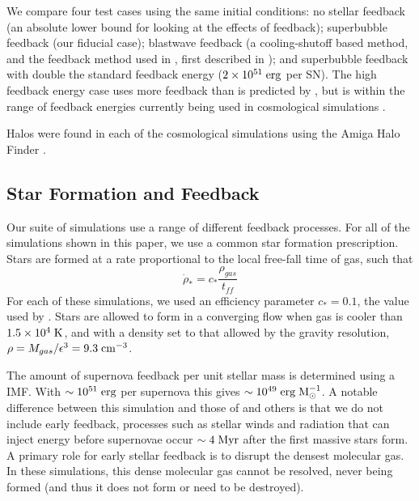 We compare four test cases using the same initial conditions: no stellar
feedback (an absolute lower bound for looking at the effects of feedback);
superbubble feedback (our fiducial case); blastwave feedback (a cooling-shutoff
based method, and the feedback method used in \citet{Stinson2010}, first
described in \citealt{Stinson2006}); and superbubble feedback with double the
standard feedback energy ($2\times10^{51}\; \rm{erg}$ per SN).  The high
feedback energy case uses more feedback than is predicted by
\citet{Leitherer1999}, but is within the range of feedback energies currently
being used in cosmological simulations \citep{Schaye2015, Agertz2015,
Vogelsberger2013}.  

Halos were found in each of the cosmological simulations using the Amiga Halo
Finder \citep[AHF;][]{Knollmann2009}.

\subsection{Star Formation and Feedback}
Our suite of simulations use a range of different feedback
processes.  For all of the simulations shown in this paper, we use a common
star formation prescription.  Stars are formed at a rate proportional to the
local free-fall time of gas, such that
\begin{equation}
    \dot \rho_* = c_* \frac{\rho_{gas}}{t_{ff}}
    \label{sflaw2}
\end{equation}
For each of these simulations, we used an efficiency parameter $c_* = 0.1$, the
value used by \citet{Stinson2013}.  Stars are allowed to form in a converging
flow when gas is cooler than $1.5\times10^4\; \rm{K}$, and with a density set to
that allowed by the gravity resolution, $\rho = M_{gas}/\epsilon^3 = 9.3\;
\rm{cm^{-3}}$.

The amount of supernova feedback per unit stellar mass is determined using a
\citet{Chabrier2003} IMF.  With $\sim10^{51}\; \rm{erg}$ per supernova this
gives $\sim10^{49}\; \rm{erg\;M^{-1}_{\odot}}$.   A notable difference between
this simulation and those of \citet{Stinson2013} and others is that we do not
include early feedback, processes such as stellar winds and radiation that can
inject energy before supernovae occur $\sim 4\; \rm{Myr}$ after the first
massive stars form.  A primary role for early stellar feedback is to disrupt the
densest molecular gas.  In these simulations, this dense molecular gas cannot be
resolved, never being formed (and thus it does not form or need to be
destroyed).

